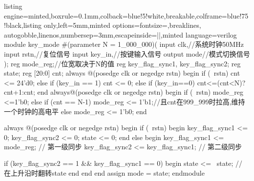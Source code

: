 \documentclass[a4paper]{article}
\begin{document}
\begin{tcblisting}{listing engine=minted,boxrule=0.1mm,colback=blue!5!white,breakable,colframe=blue!75!black,listing only,left=5mm,minted options={fontsize=\small,breaklines, autogobble,linenos,numbersep=3mm,escapeinside=||},minted language=verilog}
    module key_mode #(parameter N = 1_000_000)(
        input clk,//系统时钟50MHz
        input rstn,//复位信号
        input key_in,//按键输入信号
        output mode//模式切换信号
    );
        reg mode_reg;//位宽取决于N的值
        reg key_flag_sync1, key_flag_sync2;
        reg state;
        reg [20:0] cnt;
        always @(posedge clk or negedge rstn) begin
            if (~rstn) cnt <= 24'd0;
            else if (key_in == 1) cnt <= 0;
            else if (key_in==0) cnt<=(cnt<N)?cnt+1:cnt;
            end
        always@(posedge clk or negedge rstn) begin
            if (~rstn) mode_reg <=1'b0;
            else if (cnt == N-1) mode_reg <= 1'b1;//且cnt在999_999时拉高,维持一个时钟的高电平
            else mode_reg <= 1'b0;
        end

        always @(posedge clk or negedge rstn) begin
            if (~rstn) begin
                key_flag_sync1 <= 0;
                key_flag_sync2 <= 0;
                state <= 0;
            end else begin
                key_flag_sync1 <= mode_reg;  // 第一级同步
                key_flag_sync2 <= key_flag_sync1;  // 第二级同步

                if (key_flag_sync2 == 1 && key_flag_sync1 == 0) begin
                    state <= ~state;  // 在上升沿时翻转state
                end
            end
        end
        assign mode = state;
    endmodule
\end{tcblisting}

% 

% 
% 
\end{document}
